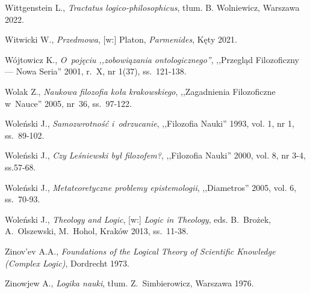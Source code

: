 \begin{thebibliography}{100}
Wittgenstein L., \textit{Tractatus logico-philosophicus}, tłum. B. Wolniewicz, Warszawa 2022.

Witwicki W., \textit{Przedmowa}, [w:] Platon, \textit{Parmenides}, Kęty 2021.

Wójtowicz K., \textit{O~pojęciu ,,zobowiązania ontologicznego''}, ,,Przegląd Filozoficzny — Nowa Seria'' 2001, r.~X, nr 1(37), ss.~121-138.

Wolak Z., \textit{Naukowa filozofia koła krakowskiego}, ,,Zagadnienia Filozoficzne w~Nauce'' 2005, nr~36, ss.~97-122.

Woleński J., \textit{Samozwrotność i~odrzucanie}, ,,Filozofia Nauki'' 1993, vol. 1, nr 1, ss.~89-102.

Woleński J., \textit{Czy Leśniewski był filozofem?}, ,,Filozofia Nauki'' 2000, vol. 8, nr 3-4, ss.57-68.

Woleński J., \textit{Metateoretyczne problemy epistemologii}, ,,Diametros'' 2005, vol. 6, ss.~70-93.

Woleński J., \textit{Theology and Logic}, [w:] \textit{Logic in Theology}, eds. B.~Brożek, A.~Olszewski, M.~Hohol, Kraków 2013, ss.~11-38.






Zinov'ev A.A., \textit{Foundations of the Logical Theory of Scientific Knowledge (Complex Logic)}, Dordrecht 1973.

Zinowjew A., \textit{Logika nauki}, tłum. Z.~Simbierowicz, Warszawa 1976.

\end{thebibliography}

